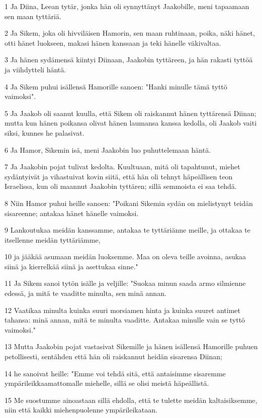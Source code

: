 \par 1 Ja Diina, Leean tytär, jonka hän oli synnyttänyt Jaakobille, meni tapaamaan sen maan tyttäriä.
\par 2 Ja Sikem, joka oli hivviläisen Hamorin, sen maan ruhtinaan, poika, näki hänet, otti hänet luokseen, makasi hänen kanssaan ja teki hänelle väkivaltaa.
\par 3 Ja hänen sydämensä kiintyi Diinaan, Jaakobin tyttäreen, ja hän rakasti tyttöä ja viihdytteli häntä.
\par 4 Ja Sikem puhui isällensä Hamorille sanoen: "Hanki minulle tämä tyttö vaimoksi".
\par 5 Ja Jaakob oli saanut kuulla, että Sikem oli raiskannut hänen tyttärensä Diinan; mutta kun hänen poikansa olivat hänen laumansa kanssa kedolla, oli Jaakob vaiti siksi, kunnes he palasivat.
\par 6 Ja Hamor, Sikemin isä, meni Jaakobin luo puhuttelemaan häntä.
\par 7 Ja Jaakobin pojat tulivat kedolta. Kuultuaan, mitä oli tapahtunut, miehet sydäntyivät ja vihastuivat kovin siitä, että hän oli tehnyt häpeällisen teon Israelissa, kun oli maannut Jaakobin tyttären; sillä semmoista ei saa tehdä.
\par 8 Niin Hamor puhui heille sanoen: "Poikani Sikemin sydän on mielistynyt teidän sisareenne; antakaa hänet hänelle vaimoksi.
\par 9 Lankoutukaa meidän kanssamme, antakaa te tyttäriänne meille, ja ottakaa te itsellenne meidän tyttäriämme,
\par 10 ja jääkää asumaan meidän luoksemme. Maa on oleva teille avoinna, asukaa siinä ja kierrelkää siinä ja asettukaa sinne."
\par 11 Ja Sikem sanoi tytön isälle ja veljille: "Suokaa minun saada armo silmienne edessä, ja mitä te vaaditte minulta, sen minä annan.
\par 12 Vaatikaa minulta kuinka suuri morsiamen hinta ja kuinka suuret antimet tahansa: minä annan, mitä te minulta vaaditte. Antakaa minulle vain se tyttö vaimoksi."
\par 13 Mutta Jaakobin pojat vastasivat Sikemille ja hänen isällensä Hamorille puhuen petollisesti, sentähden että hän oli raiskannut heidän sisarensa Diinan;
\par 14 he sanoivat heille: "Emme voi tehdä sitä, että antaisimme sisaremme ympärileikkaamattomalle miehelle, sillä se olisi meistä häpeällistä.
\par 15 Me suostumme ainoastaan sillä ehdolla, että te tulette meidän kaltaisiksemme, niin että kaikki miehenpuolenne ympärileikataan.
